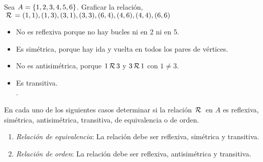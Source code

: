 \ejercicio Sea $A = \left\{ 1, 2, 3, 4, 5, 6 \right\}$. Graficar la relación, $\,\mathcal{R}\,= {(1,1), (1,3), (3,1), (3,3), (6,4), (4,6), (4,4), (6,6)}$
\begin{minipage}{0.25\textwidth}
	\veinte
\end{minipage}
\begin{minipage}{0.7\textwidth}
	\begin{itemize}
		\item No es reflexiva porque no hay bucles ni en 2 ni en 5.
		\item Es simétrica, porque hay ida y vuelta en todos los pares de vértices.
		\item No es antisimétrica, porque $1 \,\mathcal{R}\, 3$ y $3 \,\mathcal{R}\, 1$ con $1 \neq 3$.
		\item Es transitiva. \\
		      .
	\end{itemize}
\end{minipage}

\ejercicio \hacer

\ejercicio En cada uno de los siguientes casos determinar si la relación $\,\mathcal{R}\, $ en $A$ es reflexiva, simétrica,
antisimétrica, transitiva, de equivalencia o de orden.

\begin{enumerate}
	\item \textit{Relación de equivalencia}: La relación debe ser reflexiva, simétrica y transitiva.
	\item \textit{Relación de orden}: La relación debe ser reflexiva, antisimétrica y transitiva.
\end{enumerate}

